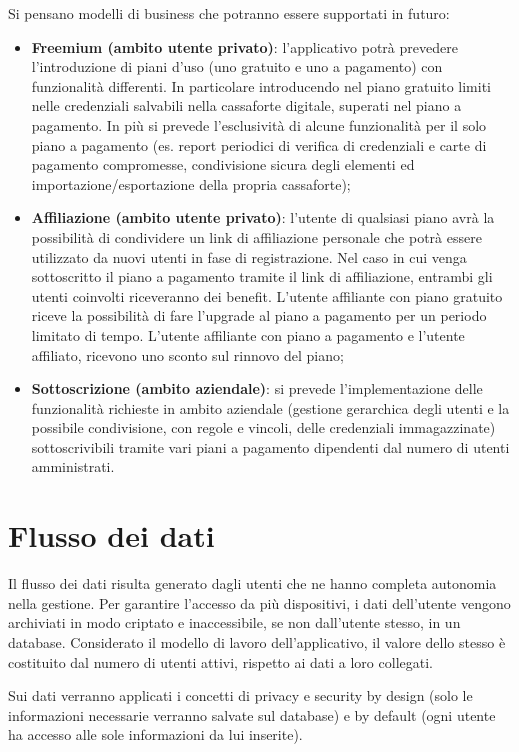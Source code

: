 \documentclass[a4paper]{report}
\begin{document}
Si pensano modelli di business che potranno essere supportati in futuro:
\begin{itemize}
    \item \textbf{Freemium (ambito utente privato)}: l'applicativo potrà prevedere l'introduzione di piani d'uso (uno gratuito e uno a pagamento) con funzionalità differenti. In particolare introducendo nel piano gratuito limiti nelle credenziali salvabili nella cassaforte digitale, superati nel piano a pagamento. In più si prevede l'esclusività di alcune funzionalità per il solo piano a pagamento (es. report periodici di verifica di credenziali e carte di pagamento compromesse, condivisione sicura degli elementi ed importazione/esportazione della propria cassaforte);
    \item \textbf{Affiliazione (ambito utente privato)}: l'utente di qualsiasi piano avrà la possibilità di condividere un link di affiliazione personale che potrà essere utilizzato da nuovi utenti in fase di registrazione. Nel caso in cui venga sottoscritto il piano a pagamento tramite il link di affiliazione, entrambi gli utenti coinvolti riceveranno dei benefit. L'utente affiliante con piano gratuito riceve la possibilità di fare l'upgrade al piano a pagamento per un periodo limitato di tempo. L'utente affiliante con piano a pagamento e l'utente affiliato, ricevono uno sconto sul rinnovo del piano;
    \item \textbf{Sottoscrizione (ambito aziendale)}: si prevede l'implementazione delle funzionalità richieste in ambito aziendale (gestione gerarchica degli utenti e la possibile condivisione, con regole e vincoli, delle credenziali immagazzinate) sottoscrivibili tramite vari piani a pagamento dipendenti dal numero di utenti amministrati.
\end{itemize}

\section{Flusso dei dati}
Il flusso dei dati risulta generato dagli utenti che ne hanno completa autonomia nella gestione. Per garantire l'accesso da più dispositivi, i dati dell'utente vengono archiviati in modo criptato e inaccessibile, se non dall'utente stesso, in un database. Considerato il modello di lavoro dell'applicativo, il valore dello stesso è costituito dal numero di utenti attivi, rispetto ai dati a loro collegati.

Sui dati verranno applicati i concetti di privacy e security by design (solo le informazioni necessarie verranno salvate sul database) e by default (ogni utente ha accesso alle sole informazioni da lui inserite).
\end{document}

